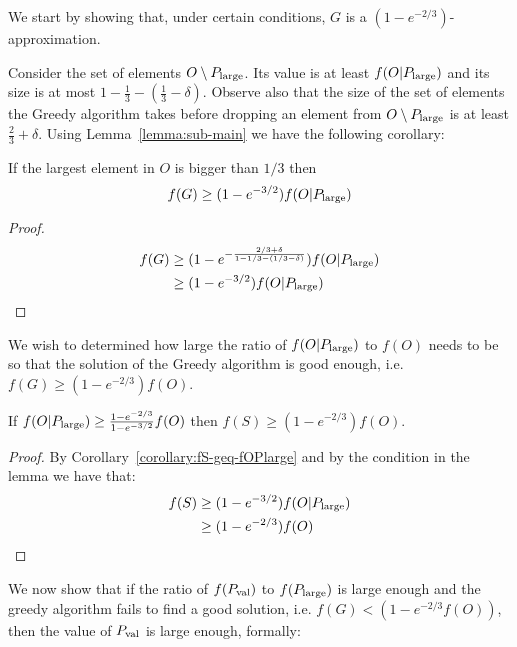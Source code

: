 We start by showing that, under certain conditions, $G$ is a $(1 - e^{-2/3})$-approximation.

Consider the set of elements $O \setminus P_{\text{large}}$.
Its value is at least $f(O|P_{\text{large}})$ and its size is at most $1 - \frac{1}{3} - (\frac{1}{3} - \delta)$.
Observe also that the size of the set of elements the Greedy algorithm takes before dropping an element from $O \setminus P_{\text{large}}$ is at least $\frac{2}{3} + \delta$.
Using Lemma~\ref{lemma:sub-main} we have the following corollary:

\begin{corollary}
	\label{corollary:fS-geq-fOPlarge}
	If the largest element in $O$ is bigger than $1/3$ then
	\begin{equation}
		f(G)  \geq (1 - e^{-3/2})f(O|P_{\text{large}})
	\end{equation}
\end{corollary}

\begin{proof}
	\begin{align*}
		f(G) & \geq (1-e^{-\frac{2/3 + \delta}{1 - 1/3 - (1/3 - \delta)}})f(O|P_{\text{large}})
		\\ & \geq (1 - e^{-3/2})f(O|P_{\text{large}})
	\end{align*}
\end{proof}

We wish to determined how large the ratio of $f(O|P_{\text{large}})$ to $f(O)$ needs to be so that the solution of the Greedy algorithm is good enough, i.e. $f(G) \geq (1-e^{-2/3})f(O)$.

\begin{lemma}
	\label{corollary:greedy-good}
	If $f(O|P_{\text{large}}) \geq \frac{1-e^{-2/3}}{1-e^{-3/2}}f(O)$ then $f(S) \geq (1 - e^{-2/3})f(O)$.
\end{lemma}

\begin{proof}
	By Corollary~\ref{corollary:fS-geq-fOPlarge} and by the condition in the lemma we have that:
	\begin{align*}
		f(S)	& \geq (1 - e^{-3/2})f(O|P_{\text{large}})
		\\
				& \geq (1 - e^{-2/3})f(O)
	\end{align*}
\end{proof}

We now show that if the ratio of $f(P_{\text{val}})$ to $f(P_{\text{large}})$ is large enough and the greedy algorithm fails to find a good solution, i.e. $f(G) < (1 - e^{-2/3}f(O))$, then the value of $P_{\text{val}}$ is large enough, formally:


